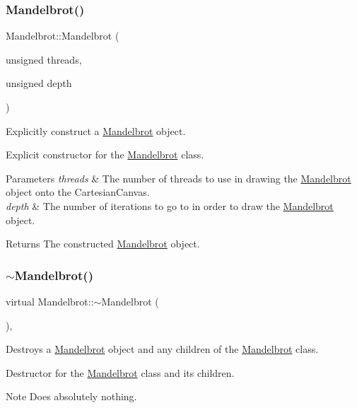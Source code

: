 \subsubsection{\texorpdfstring{Mandelbrot()}{Mandelbrot()}}
{\footnotesize\ttfamily Mandelbrot\+::\+Mandelbrot (\begin{DoxyParamCaption}\item[{unsigned}]{threads,  }\item[{unsigned}]{depth }\end{DoxyParamCaption})}



Explicitly construct a \hyperlink{class_mandelbrot}{Mandelbrot} object. 

Explicit constructor for the \hyperlink{class_mandelbrot}{Mandelbrot} class. 
\begin{DoxyParams}{Parameters}
{\em threads} & The number of threads to use in drawing the \hyperlink{class_mandelbrot}{Mandelbrot} object onto the Cartesian\+Canvas. \\
\hline
{\em depth} & The number of iterations to go to in order to draw the \hyperlink{class_mandelbrot}{Mandelbrot} object. \\
\hline
\end{DoxyParams}
\begin{DoxyReturn}{Returns}
The constructed \hyperlink{class_mandelbrot}{Mandelbrot} object. 
\end{DoxyReturn}
\mbox{\label{class_mandelbrot_a886df208f291f5d24d7f8f582962bb84}} 
\subsubsection{\texorpdfstring{$\sim$\+Mandelbrot()}{~Mandelbrot()}}
{\footnotesize\ttfamily virtual Mandelbrot\+::$\sim$\+Mandelbrot (\begin{DoxyParamCaption}{ }\end{DoxyParamCaption})\hspace{0.3cm}{\ttfamily [inline]}, {\ttfamily [virtual]}}



Destroys a \hyperlink{class_mandelbrot}{Mandelbrot} object and any children of the \hyperlink{class_mandelbrot}{Mandelbrot} class. 

Destructor for the \hyperlink{class_mandelbrot}{Mandelbrot} class and its children. \begin{DoxyNote}{Note}
Does absolutely nothing. 
\end{DoxyNote}


